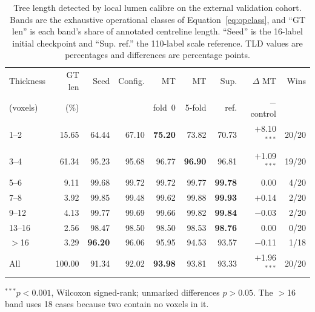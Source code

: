 \begin{currentcontrolroute}
\begin{table}[htbp]
  \centering
  \footnotesize
  \setlength{\tabcolsep}{2pt}
  \caption[Tree length stratified by ground-truth airway calibre]{Tree length detected by local
  lumen calibre on the external validation cohort. Bands are the exhaustive operational classes
  of Equation~\eqref{eq:opclass}, and ``GT len'' is each band's share of annotated centreline
  length. ``Seed'' is the 16-label initial checkpoint and ``Sup. ref.'' the 110-label scale
  reference. TLD values are percentages and differences are percentage points.}
  \label{tab:calibre-td}
  \begin{tabular}{lrrrrrrrr}
    \toprule
    Thickness & GT len & Seed & Config. & MT & MT & Sup. & $\Delta$ MT & Wins \\
    (voxels) & (\%) & & & fold~0 & 5-fold & ref. & $-$ control & \\
    \midrule
    1--2   & 15.65 & 64.44 & 67.10 & \textbf{75.20} & 73.82 & 70.73 & $+$8.10$^{***}$ & 20/20 \\
    3--4   & 61.34 & 95.23 & 95.68 & 96.77 & \textbf{96.90} & 96.81 & $+$1.09$^{***}$ & 19/20 \\
    5--6   &  9.11 & 99.68 & 99.72 & 99.72 & 99.77 & \textbf{99.78} & 0.00 & 4/20 \\
    7--8   &  3.92 & 99.85 & 99.48 & 99.62 & 99.88 & \textbf{99.93} & $+$0.14 & 2/20 \\
    9--12  &  4.13 & 99.77 & 99.69 & 99.66 & 99.82 & \textbf{99.84} & $-$0.03 & 2/20 \\
    13--16 &  2.56 & 98.47 & 98.50 & 98.50 & 98.53 & \textbf{98.76} & 0.00 & 0/20 \\
    $>$16  &  3.29 & \textbf{96.20} & 96.06 & 95.95 & 94.53 & 93.57 & $-$0.11 & 1/18 \\
    \midrule
    All    & 100.00 & 91.34 & 92.02 & \textbf{93.98} & 93.81 & 93.33 & $+$1.96$^{***}$ & 20/20 \\
    \bottomrule
  \end{tabular}
  \parbox{\linewidth}{\footnotesize $^{***}p<0.001$, Wilcoxon signed-rank; unmarked
  differences $p>0.05$. The $>$16 band uses 18 cases because two contain no voxels in it.}
\end{table}


\end{currentcontrolroute}
